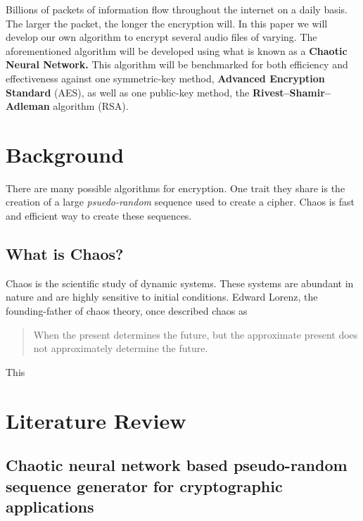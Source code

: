 \documentclass[conference]{IEEEtran}
\begin{document}
Billions of packets of information flow throughout the internet on a daily basis.
The larger the packet, the longer the encryption will.
In this paper we will develop our own algorithm to encrypt several audio files of varying.
The aforementioned algorithm will be developed using what is known as a \textbf{Chaotic Neural Network.}
This algorithm will be benchmarked for both efficiency and effectiveness against one symmetric-key method, \textbf{Advanced Encryption Standard} (AES), as well as one public-key method, the \textbf{Rivest–Shamir–Adleman} algorithm (RSA).


\section{Background}\label{sec:background}

There are many possible algorithms for encryption.
One trait they share is the creation of a large \textit{psuedo-random} sequence used to create a cipher.
Chaos is fast and efficient way to create these sequences.

\subsection{What is Chaos?}\label{subsec:what-is-chaos?}

Chaos is the scientific study of dynamic systems.
These systems are abundant in nature and are highly sensitive to initial conditions.
Edward Lorenz, the founding-father of chaos theory, once described chaos as

\begin{framed}
    \begin{quote}
        When the present determines the future, but the approximate present does not approximately determine the future.~\cite{Alligood}
    \end{quote}
\end{framed}


This

\section{Literature Review}\label{sec:literature-review}

\subsection{Chaotic neural network based pseudo-random sequence generator for cryptographic applications}\cite{Lokesh}
\end{document}
